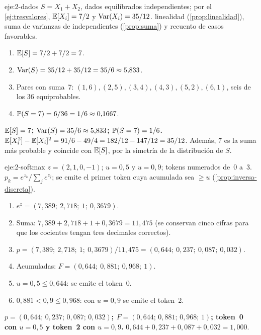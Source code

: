 \begin{solucion}{eje:2-dados}
\datos $S=X_1+X_2$, dados equilibrados independientes; por el \cref{ej:tresvalores}, $\mathbb{E}[X_i]=7/2$ y $\operatorname{Var}(X_i)=35/12$.
\planteamiento linealidad (\cref{prop:linealidad}), suma de varianzas de independientes (\cref{prop:suma}) y recuento de casos favorables.
\pasos
\begin{enumerate}[label=\arabic*.]
  \item $\mathbb{E}[S]=7/2+7/2=7$.
  \item $\operatorname{Var}(S)=35/12+35/12=35/6\approx 5{,}833$.
  \item Pares con suma~7: $(1,6),(2,5),(3,4),(4,3),(5,2),(6,1)$, seis de los 36 equiprobables.
  \item $\mathbb{P}(S=7)=6/36=1/6\approx 0{,}1667$.
\end{enumerate}
\resultado \textbf{$\mathbb{E}[S]=7$; $\operatorname{Var}(S)=35/6\approx 5{,}833$; $\mathbb{P}(S=7)=1/6$.}
\comprobacion $\mathbb{E}[X_i^{2}]-\mathbb{E}[X_i]^{2}=91/6-49/4=182/12-147/12=35/12$. Además, $7$ es la suma más probable y coincide con $\mathbb{E}[S]$, por la simetría de la distribución de $S$.
\end{solucion}

\begin{solucion}{eje:2-softmax}
\datos $z=(2,1,0,-1)$; $u=0{,}5$ y $u=0{,}9$; tokens numerados de~0 a~3.
\planteamiento $p_k=e^{z_k}/\sum_j e^{z_j}$; se emite el primer token cuya acumulada sea $\ge u$ (\cref{prop:inversa-discreta}).
\pasos
\begin{enumerate}[label=\arabic*.]
  \item $e^{z}=(7{,}389;\ 2{,}718;\ 1;\ 0{,}3679)$.
  \item Suma: $7{,}389+2{,}718+1+0{,}3679=11{,}475$ (se conservan cinco cifras para que los cocientes tengan tres decimales correctos).
  \item $p=(7{,}389;\ 2{,}718;\ 1;\ 0{,}3679)/11{,}475=(0{,}644;\ 0{,}237;\ 0{,}087;\ 0{,}032)$.
  \item Acumuladas: $F=(0{,}644;\ 0{,}881;\ 0{,}968;\ 1)$.
  \item $u=0{,}5\le 0{,}644$: se emite el token~0.
  \item $0{,}881<0{,}9\le 0{,}968$: con $u=0{,}9$ se emite el token~2.
\end{enumerate}
\resultado \textbf{$p=(0{,}644;\,0{,}237;\,0{,}087;\,0{,}032)$; $F=(0{,}644;\,0{,}881;\,0{,}968;\,1)$; token~0 con $u=0{,}5$ y token~2 con $u=0{,}9$.}
\comprobacion $0{,}644+0{,}237+0{,}087+0{,}032=1{,}000$.
\end{solucion}


